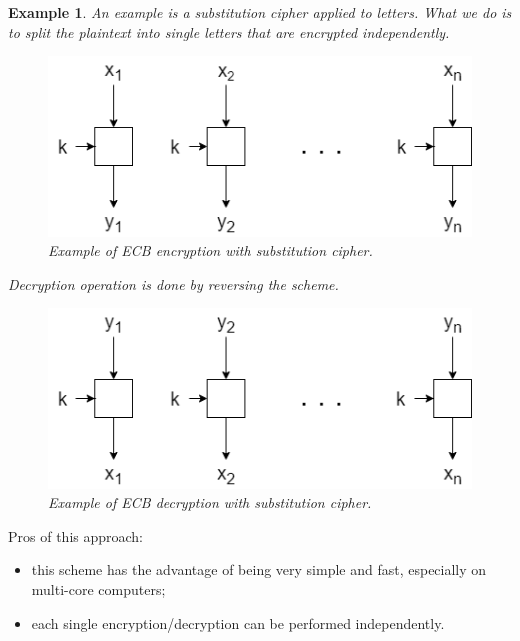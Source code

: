 \documentclass[a4paper, 12pt]{report}
\newtheorem{example}{\textbf{Example}}
\begin{document}
\begin{example}
	An example is a substitution cipher applied to letters. What we do is to split the plaintext into single letters that are encrypted independently.
	\begin{figure}[H]
		\centering
		\includegraphics[scale=0.6]{images/Lec4/blockciphers.png}
		\caption{Example of ECB encryption with substitution cipher.}
		\label{fig:exampleECBEnc}
	\end{figure}
	Decryption operation is done by reversing the scheme.
	\begin{figure}[H]
		\centering
		\includegraphics[scale=0.6]{images/Lec9/ECBDec.png}
		\caption{Example of ECB decryption with substitution cipher.}
		\label{fig:exampleECBDec}
	\end{figure}
\end{example}

Pros of this approach:
\begin{itemize}
	\item this scheme has the advantage of being very simple and fast, especially on multi-core computers;
	\item each single encryption/decryption can be performed independently. 
\end{itemize}
\end{document}
